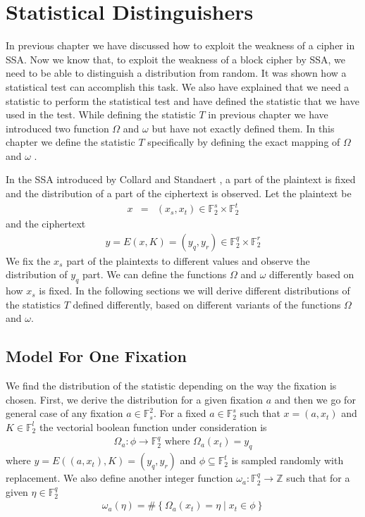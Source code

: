 \chapter{Statistical Distinguishers}
\label{chapter:statistical_distinguishers} In previous chapter we have discussed how to exploit the weakness of a cipher in SSA. Now we know that, to exploit the weakness of a block cipher by SSA, we need to be able to distinguish a distribution from random. It was shown how a statistical test can accomplish this task. We also have explained that we need a statistic to perform the statistical test and have defined the statistic that we have used in the test. While defining the statistic $T$ in previous chapter we have introduced two function $\Omega$ and $\omega$ but have not exactly defined them. In this chapter we define the statistic $T$ specifically by defining the exact mapping of $\Omega$ and $\omega$ .
\par \noindent In the SSA introduced by Collard and Standaert \cite{SSA_Collard_Standaert}, a part of the plaintext is fixed and the distribution of a part of the ciphertext is observed. Let the plaintext be 
\begin{eqnarray*}
x&=&(x_s,x_t) \in \mathbb{F}_{2}^{s} \times \mathbb{F}_{2}^{t}
\end{eqnarray*} and the ciphertext 
\begin{eqnarray*}
y = E(x,K) = (y_q,y_r) \in \mathbb{F}_{2}^{q} \times \mathbb{F}_{2}^{r}
\end{eqnarray*} We fix the $x_s$ part of the plaintexts to different values and observe the distribution of $y_q$ part. We can define the functions $\Omega$ and $\omega$ differently based on how $x_s$ is fixed. In the following sections we will derive different distributions of the statistics $T$ defined differently, based on different variants of the functions $\Omega$ and $\omega$. 
\section{Model For One Fixation} \label{section:model_for_one_fixation}
We find the distribution of the statistic depending on the way the fixation is chosen. First, we derive the distribution for a given fixation $a$ and then we go for general case of any fixation $a \in \mathbb{F}^2_s$. For a fixed $a \in \mathbb{F}_{2}^{s}$ such that $x = (a,x_t)$ and $K \in \mathbb{F}_{2}^{l}$ the vectorial boolean function under consideration is
\begin{eqnarray}
\Omega_{a}: \phi \rightarrow \mathbb{F}_{2}^{q} \mbox{ where } \Omega_{a}(x_t)=y_q
\end{eqnarray} where $y = E\left(\left(a,x_t\right),K\right) = (y_q,y_r)$ and $\phi \subseteq \mathbb{F}_{2}^{t}$ is sampled randomly with replacement. We also define another integer function $\omega_a:\mathbb{F}_2^q \rightarrow \mathbb{Z}$ such that for a given $\eta \in \mathbb{F}_2^q$
\begin{eqnarray}
\omega_a\left(\eta \right) =  \# \left\lbrace \Omega_a\left( x_t \right) = \eta \; \vert \; x_t \in \phi \right\rbrace  \label{eqn:omega_a}
\end{eqnarray}
